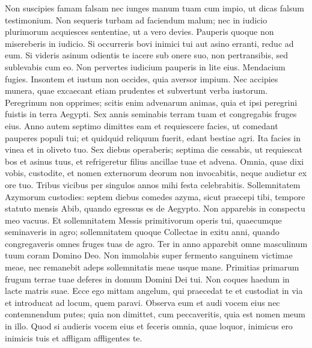 \begin{biblechapter}
\begin{biblechapter}
\begin{biblechapter}
\begin{biblechapter}
\begin{biblechapter}
\begin{biblechapter}
\begin{biblechapter}
\begin{biblechapter}
\begin{biblechapter}
\begin{biblechapter}
\begin{biblechapter}
\begin{biblechapter}
\begin{biblechapter}
\begin{biblechapter}
\begin{biblechapter}
\begin{biblechapter}
\begin{biblechapter}
\begin{biblechapter}
\begin{biblechapter}
\begin{biblechapter}
\begin{biblechapter}
\begin{biblechapter}
\begin{biblechapter}
\verse Non suscipies famam falsam nec iunges manum tuam cum impio, ut dicas falsum testimonium.
 \verse Non sequeris turbam ad faciendum malum; nec in iudicio plurimorum acquiesces sententiae, ut a vero devies.
 \verse Pauperis quoque non misereberis in iudicio.
 \verse Si occurreris bovi inimici tui aut asino erranti, reduc ad eum.
 \verse Si videris asinum odientis te iacere sub onere suo, non pertransibis, sed sublevabis cum eo.
 \verse Non pervertes iudicium pauperis in lite eius.
 \verse Mendacium fugies. Insontem et iustum non occides, quia aversor impium.
 \verse Nec accipies munera, quae excaecant etiam prudentes et subvertunt verba iustorum.
 \verse Peregrinum non opprimes; scitis enim advenarum animas, quia et ipsi peregrini fuistis in terra Aegypti.
 \verse Sex annis seminabis terram tuam et congregabis fruges eius. 
\verse Anno autem septimo dimittes eam et requiescere facies, ut comedant pauperes populi tui; et quidquid reliquum fuerit, edant bestiae agri. Ita facies in vinea et in oliveto tuo.
 \verse Sex diebus operaberis; septima die cessabis, ut requiescat bos et asinus tuus, et refrigeretur filius ancillae tuae et advena.
 \verse Omnia, quae dixi vobis, custodite, et nomen externorum deorum non invocabitis, neque audietur ex ore tuo.
 \verse Tribus vicibus per singulos annos mihi festa celebrabitis.
 \verse Sollemnitatem Azymorum custodies: septem diebus comedes azyma, sicut praecepi tibi, tempore statuto mensis Abib, quando egressus es de Aegypto.
 Non apparebis in conspectu meo vacuus.
 \verse Et sollemnitatem Messis primitivorum operis tui, quaecumque seminaveris in agro; sollemnitatem quoque Collectae in exitu anni, quando congregaveris omnes fruges tuas de agro.
 \verse Ter in anno apparebit omne masculinum tuum coram Domino Deo.
 \verse Non immolabis super fermento sanguinem victimae meae, nec remanebit adeps sollemnitatis meae usque mane.
 \verse Primitias primarum frugum terrae tuae deferes in domum Domini Dei tui.
 Non coques haedum in lacte matris suae.
 \verse Ecce ego mittam angelum, qui praecedat te et custodiat in via et introducat ad locum, quem paravi. 
\verse Observa eum et audi vocem eius nec contemnendum putes; quia non dimittet, cum peccaveritis, quia est nomen meum in illo. 
\verse Quod si audieris vocem eius et feceris omnia, quae loquor, inimicus ero inimicis tuis et affligam affligentes te.

\end{biblechapter}
\end{biblechapter}
\end{biblechapter}
\end{biblechapter}
\end{biblechapter}
\end{biblechapter}
\end{biblechapter}
\end{biblechapter}
\end{biblechapter}
\end{biblechapter}
\end{biblechapter}
\end{biblechapter}
\end{biblechapter}
\end{biblechapter}
\end{biblechapter}
\end{biblechapter}
\end{biblechapter}
\end{biblechapter}
\end{biblechapter}
\end{biblechapter}
\end{biblechapter}
\end{biblechapter}
\end{biblechapter}

